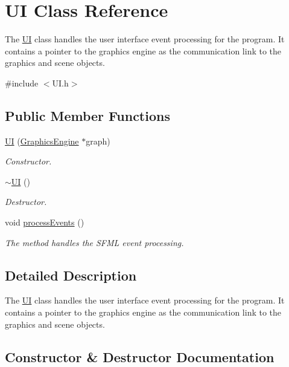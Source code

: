 \hypertarget{class_u_i}{}\section{UI Class Reference}
\label{class_u_i}


The \hyperlink{class_u_i}{UI} class handles the user interface event processing for the program. It contains a pointer to the graphics engine as the communication link to the graphics and scene objects.  




{\ttfamily \#include $<$U\+I.\+h$>$}

\subsection*{Public Member Functions}
\begin{DoxyCompactItemize}
\item 
\hyperlink{class_u_i_a9c605272304cb2d5efff79edb32e9241}{UI} (\hyperlink{class_graphics_engine}{Graphics\+Engine} $\ast$graph)
\begin{DoxyCompactList}\small\item\em Constructor. \end{DoxyCompactList}\item 
\hyperlink{class_u_i_a1b23d0c64c7cbb3d143d90ec532a7ccd}{$\sim$\+UI} ()
\begin{DoxyCompactList}\small\item\em Destructor. \end{DoxyCompactList}\item 
void \hyperlink{class_u_i_a440e133dbf19d82b8b40809644494068}{process\+Events} ()
\begin{DoxyCompactList}\small\item\em The method handles the S\+F\+ML event processing. \end{DoxyCompactList}\end{DoxyCompactItemize}


\subsection{Detailed Description}
The \hyperlink{class_u_i}{UI} class handles the user interface event processing for the program. It contains a pointer to the graphics engine as the communication link to the graphics and scene objects. 

\subsection{Constructor \& Destructor Documentation}
\mbox{\label{class_u_i_a9c605272304cb2d5efff79edb32e9241}} 
